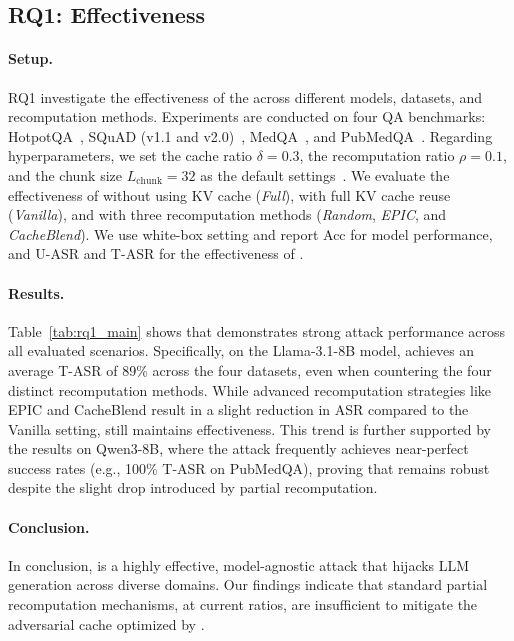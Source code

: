 




\subsection{RQ1: Effectiveness}\label{sec:rq1}

\paragraph{Setup.}
RQ1 investigate the effectiveness of the \sys across different models, datasets, and recomputation methods.
% 
Experiments are conducted on four QA benchmarks: HotpotQA~\cite{yang2018hotpotqa}, SQuAD (v1.1 and v2.0)~\cite{rajpurkar2016squad,rajpurkar2018know}, MedQA~\cite{jin2021disease}, and PubMedQA~\cite{jin2019pubmedqa}. 
% 
Regarding hyperparameters, we set the cache ratio $\delta = 0.3$, the recomputation ratio $\rho = 0.1$, and the chunk size $L_{\mathrm{chunk}} = 32$ as the default settings~\cite{yao2025cacheblend, hu2025epic}. We evaluate the effectiveness of \sys without using KV cache (\textit{Full}), with full KV cache reuse (\textit{Vanilla}), and with three recomputation methods (\textit{Random}, \textit{EPIC}, and \textit{CacheBlend}).
% 
We use white-box setting and report Acc for model performance, and U-ASR and T-ASR for the effectiveness of \sys.


\paragraph{Results.} 
Table~\ref{tab:rq1_main} shows that \sys demonstrates strong attack performance across all evaluated scenarios.
% 
Specifically, on the Llama-3.1-8B model, \sys achieves an average T-ASR of 89\% across the four datasets, even when countering the four distinct recomputation methods. While advanced recomputation strategies like EPIC and CacheBlend result in a slight reduction in ASR compared to the Vanilla setting, \sys still maintains  effectiveness. This trend is further supported by the results on Qwen3-8B, where the attack frequently achieves near-perfect success rates (e.g., 100\% T-ASR on PubMedQA), proving that \sys remains robust despite the slight drop introduced by partial recomputation.

\paragraph{Conclusion.}
In conclusion, \sys is a highly effective, model-agnostic attack that hijacks LLM generation across diverse domains. Our findings indicate that standard partial recomputation mechanisms, at current ratios, are insufficient to mitigate the adversarial cache optimized by \sys.